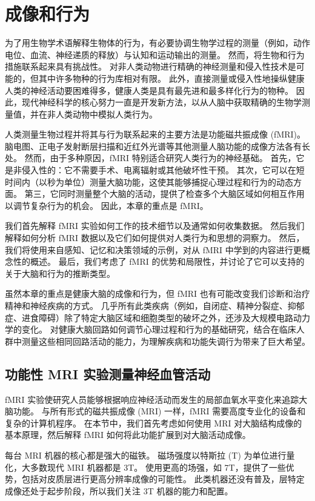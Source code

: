 \chapter{成像和行为} \label{chap:chap6}
为了用生物学术语解释生物体的行为，有必要协调生物学过程的测量（例如，动作电位、血流、神经递质的释放）与认知和运动输出的测量。 
然而，将生物和行为措施联系起来具有挑战性。 
对非人类动物进行精确的神经测量和侵入性技术是可能的，但其中许多物种的行为库相对有限。 
此外，直接测量或侵入性地操纵健康人类的神经活动要困难得多，健康人类是具有最先进和最多样化行为的物种。 
因此，现代神经科学的核心努力一直是开发新方法，以从人脑中获取精确的生物学测量值，并在非人类动物中模拟人类行为。


人类测量生物过程并将其与行为联系起来的主要方法是功能磁共振成像 (fMRI)。 
脑电图、正电子发射断层扫描和近红外光谱等其他测量人脑功能的成像方法各有长处。 
然而，由于多种原因，fMRI 特别适合研究人类行为的神经基础。 
首先，它是非侵入性的：它不需要手术、电离辐射或其他破坏性干预。 
其次，它可以在短时间内（以秒为单位）测量大脑功能，这使其能够捕捉心理过程和行为的动态方面。 
第三，它同时测量整个大脑的活动，提供了检查多个大脑区域如何相互作用以调节复杂行为的机会。 
因此，本章的重点是 fMRI。


我们首先解释 fMRI 实验如何工作的技术细节以及通常如何收集数据。 
然后我们解释如何分析 fMRI 数据以及它们如何提供对人类行为和思想的洞察力。 
然后，我们将使用来自感知、记忆和决策领域的示例，对从 fMRI 中学到的内容进行更概念性的概述。 
最后，我们考虑了 fMRI 的优势和局限性，并讨论了它可以支持的关于大脑和行为的推断类型。


虽然本章的重点是健康大脑的成像和行为，但 fMRI 也有可能改变我们诊断和治疗精神和神经疾病的方式。 
几乎所有此类疾病（例如，自闭症、精神分裂症、抑郁症、进食障碍）除了特定大脑区域和细胞类型的破坏之外，还涉及大规模电路动力学的变化。 
对健康大脑回路如何调节心理过程和行为的基础研究，结合在临床人群中测量这些相同回路活动的能力，为理解疾病和功能失调行为带来了巨大希望。


\section{功能性 MRI 实验测量神经血管活动}

fMRI 实验使研究人员能够根据响应神经活动而发生的局部血氧水平变化来追踪大脑功能。 
与所有形式的磁共振成像 (MRI) 一样，fMRI 需要高度专业化的设备和复杂的计算机程序。 
在本节中，我们首先考虑如何使用 MRI 对大脑结构成像的基本原理，然后解释 fMRI 如何将此功能扩展到对大脑活动成像。


每台 MRI 机器的核心都是强大的磁铁。 
磁场强度以特斯拉 (T) 为单位进行量化，大多数现代 MRI 机器都是 3T。 
使用更高的场强，如 7T，提供了一些优势，包括对皮质层进行更高分辨率成像的可能性。 
此类机器还没有普及，层特定成像还处于起步阶段，所以我们关注 3T 机器的能力和配置。


